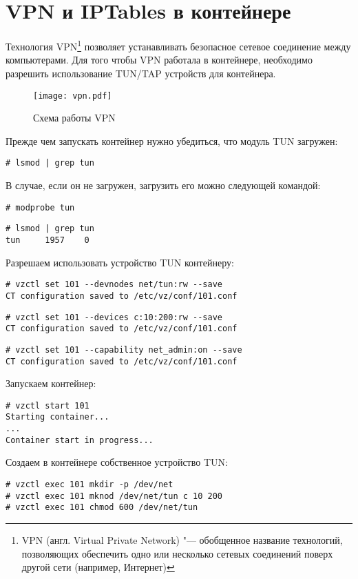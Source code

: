 \section{VPN и IPTables в контейнере}

Технология VPN\footnote{VPN (англ. Virtual Private Network) "--- обобщенное название технологий, позволяющих обеспечить одно или несколько сетевых соединений поверх другой сети (например, Интернет)} позволяет устанавливать безопасное сетевое соединение между компьютерами.
Для того чтобы VPN работала в контейнере, необходимо разрешить использование TUN/TAP устройств для контейнера.
\begin{figure}[ht]
    \centering
	\texttt{[image: vpn.pdf]}
	\caption{Схема работы VPN}\label{pic:vpn}
\end{figure}

Прежде чем запускать контейнер нужно убедиться, что модуль TUN загружен:
\begin{lstlisting}
# lsmod | grep tun
\end{lstlisting}

В случае, если он не загружен, загрузить его можно следующей командой:
\begin{lstlisting}
# modprobe tun
\end{lstlisting}
\begin{lstlisting}
# lsmod | grep tun
tun     1957    0
\end{lstlisting}

Разрешаем использовать устройство TUN контейнеру:
\begin{lstlisting}
# vzctl set 101 --devnodes net/tun:rw --save
CT configuration saved to /etc/vz/conf/101.conf
\end{lstlisting}
\begin{lstlisting}
# vzctl set 101 --devices c:10:200:rw --save
CT configuration saved to /etc/vz/conf/101.conf
\end{lstlisting}
\begin{lstlisting}
# vzctl set 101 --capability net_admin:on --save
CT configuration saved to /etc/vz/conf/101.conf
\end{lstlisting}

Запускаем контейнер:
\begin{lstlisting}
# vzctl start 101
Starting container...
...
Container start in progress...
\end{lstlisting}

Создаем в контейнере собственное устройство TUN:
\begin{lstlisting}
# vzctl exec 101 mkdir -p /dev/net
# vzctl exec 101 mknod /dev/net/tun c 10 200
# vzctl exec 101 chmod 600 /dev/net/tun
\end{lstlisting}

